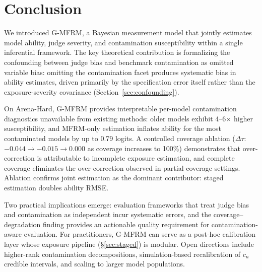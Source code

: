 \section{Conclusion}
\label{sec:conclusion}

We introduced G-MFRM, a Bayesian measurement model that jointly estimates model ability, judge severity, and contamination susceptibility within a single inferential framework. The key theoretical contribution is formalizing the confounding between judge bias and benchmark contamination as omitted variable bias: omitting the contamination facet produces systematic bias in ability estimates, driven primarily by the specification error itself rather than the exposure-severity covariance (Section~\ref{sec:confounding}).

On Arena-Hard, G-MFRM provides interpretable per-model contamination diagnostics unavailable from existing methods: older models exhibit 4--6$\times$ higher susceptibility, and MFRM-only estimation inflates ability for the most contaminated models by up to 0.79 logits. A controlled coverage ablation ($\Delta\tau$: $-0.044 \to -0.015 \to 0.000$ as coverage increases to 100\%) demonstrates that over-correction is attributable to incomplete exposure estimation, and complete coverage eliminates the over-correction observed in partial-coverage settings. Ablation confirms joint estimation as the dominant contributor: staged estimation doubles ability RMSE.

Two practical implications emerge: evaluation frameworks that treat judge bias and contamination as independent incur systematic errors, and the coverage--degradation finding provides an actionable quality requirement for contamination-aware evaluation. For practitioners, G-MFRM can serve as a post-hoc calibration layer whose exposure pipeline (\S\ref{sec:staged}) is modular. Open directions include higher-rank contamination decompositions, simulation-based recalibration \citep{talts2018sbc} of $c_n$ credible intervals, and scaling to larger model populations.